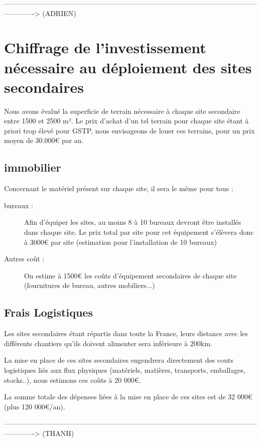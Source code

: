 -------------------------------------------------------------------------------------------------------------------------> (ADRIEN)

\section{Chiffrage de l'investissement nécessaire au déploiement des sites secondaires}

    Nous avons évalué la superficie de terrain nécessaire à chaque site secondaire entre 1500 et 2500 m². Le prix d'achat d'un tel terrain pour chaque site étant à priori trop élevé pour GSTP, nous envisageons de louer ces terrains, pour un prix moyen de 30.000€ par an.

    \subsection{immobilier}

        Concernant le matériel présent sur chaque site, il sera le même pour tous : 
        \begin{description}
	        \item[bureaux : ] Afin d'équiper les sites, au moins 8 à 10 bureaux devront être installés dans chaque site. Le prix total par site pour cet équipement s'élèvera donc à 3000€ par site (estimation pour l'installation de 10 bureaux)
	        \item[Autres coût :]  On estime à 1500€ les coûts d'équipement secondaires de chaque site (fournitures de bureau, autres mobiliers...)
        \end{description}

        \subsection{Frais Logistiques}
        Les sites secondaires étant répartis dans toute la France, leurs distance avec les différents chantiers qu'ils doivent alimenter sera inférieure à 200km.

        La mise en place de ces sites secondaires engendrera directement des couts logistiques liés aux flux physiques (matériels, matières, transports, emballages, stocks..), nous estimons ces coûts à 20 000€.

        La somme totale des dépenses liées à la mise en place de ces sites est de 32 000€ (plus 120 000€/an).

        -------------------------------------------------------------------------------------------------------------------------> (THANH)

